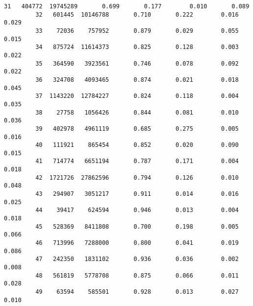 \documentclass[11pt]{article}
\begin{document}
\begin{Verbatim}[commandchars=\\\{\}]
         31   404772  19745289       0.699       0.177        0.010       0.089   
         32   601445  10146788       0.710       0.222        0.016       0.029   
         33    72036    757952       0.879       0.029        0.055       0.015   
         34   875724  11614373       0.825       0.128        0.003       0.022   
         35   364590   3923561       0.746       0.078        0.092       0.022   
         36   324708   4093465       0.874       0.021        0.018       0.045   
         37  1143220  12784227       0.824       0.118        0.004       0.035   
         38    27758   1056426       0.844       0.081        0.010       0.036   
         39   402978   4961119       0.685       0.275        0.005       0.016   
         40   111921    865454       0.852       0.020        0.090       0.015   
         41   714774   6651194       0.787       0.171        0.004       0.018   
         42  1721726  27862596       0.794       0.126        0.010       0.048   
         43   294907   3051217       0.911       0.014        0.016       0.025   
         44    39417    624594       0.946       0.013        0.004       0.018   
         45   528369   8411808       0.700       0.198        0.005       0.066   
         46   713996   7288000       0.800       0.041        0.019       0.086   
         47   242350   1831102       0.936       0.036        0.002       0.008   
         48   561819   5778708       0.875       0.066        0.011       0.028   
         49    63594    585501       0.928       0.013        0.027       0.010   
         

\end{Verbatim}
\end{document}
